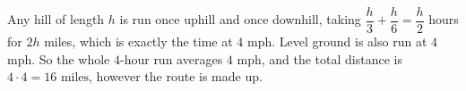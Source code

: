 Any hill of length $h$ is run once uphill and once downhill, taking $\dfrac {h}{3}+\dfrac {h}{6}=\dfrac {h}{2}$ hours for $2h$ miles, which is exactly the time at $4$ mph. Level ground is also run at $4$ mph. So the whole $4$-hour run averages $4$ mph, and the total distance is $4\cdot4=\boxed{16\text{ miles}}$, however the route is made up.
